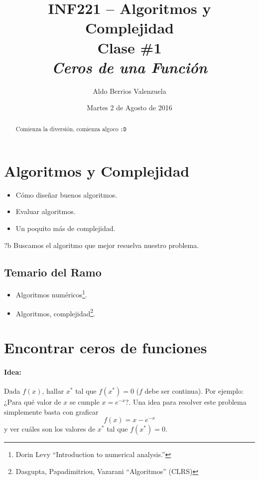 \documentclass[english, spanish, fleqn, 10pt]{article}
\title{INF221 -- Algoritmos y Complejidad\\[.4\baselineskip]Clase \#1\\\textit{Ceros de una Función}}
\author{Aldo Berrios Valenzuela}
\date{Martes 2 de Agosto de 2016}
\newcommand{\comillas}[1]{``#1''}
\numberwithin{equation}{section}
\newcommand{\nparentesis}[1]{\left( #1 \right)}
\theoremstyle{definition}
\newenvironment{newquote}{\renewcommand{\arraystretch}{1.8}\color[HTML]{009933}\begin{longtable}{?b}}{\end{longtable}\renewcommand{\arraystretch}{1.3}}
\begin{document}
\maketitle
\begin{abstract}
	Comienza la diversión, comienza algoco \texttt{:D}
\end{abstract}

\section{Algoritmos y Complejidad}
\begin{itemize}
	\item Cómo diseñar buenos algoritmos.
	\item Evaluar algoritmos.
	\item Un poquito más de complejidad.
\end{itemize}
\begin{newquote}
	Buscamos el algoritmo que mejor resuelva nuestro problema.
\end{newquote}
\vspace{-2em}
\subsection{Temario del Ramo}
\begin{itemize}
	\item Algoritmos numéricos\footnote{Dorin Levy \comillas{Introduction to numerical analysis.}}.
	
	\item Algoritmos, complejidad\footnote{Dasgupta, Papadimitriou, Vazarani \comillas{Algoritmos} (CLRS)}.
\end{itemize}

\section{Encontrar ceros de funciones}
\paragraph{Idea:} Dada $f\nparentesis{x}$, hallar $x^*$ tal que $f\nparentesis{x^*}=0$ ($f$ debe ser continua). Por ejemplo: ¿Para qué valor de $x$ se cumple $x=e^{-x}$?. Una idea para resolver este problema simplemente basta con graficar
\begin{equation}
f\nparentesis{x}=x-e^{-x}
\end{equation}
y ver cuáles son los valores de $x^*$ tal que $f\nparentesis{x^*}=0$.
\end{document}
